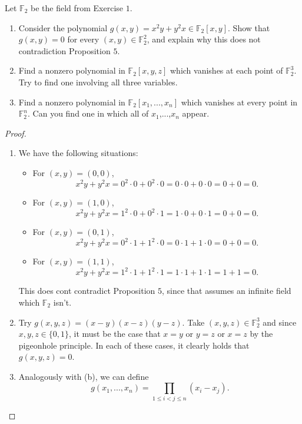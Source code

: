 \begin{exercise}{2}
Let $\mathbb{F}_2$ be the field from Exercise $1$.
\begin{enumerate}
    \item Consider the polynomial $g(x,y) = x^2 y + y^2 x\in \mathbb{F}_2[x,y]$. Show that $g(x,y) = 0$ for every $(x,y)\in \mathbb{F}_2^2$, and explain why this does not contradiction Proposition $5$.
    \item Find a nonzero polynomial in $\mathbb{F}_2[x,y,z]$ which vanishes at each point of $\mathbb{F}_2^3$. Try to find one involving all three variables.
    \item Find a nonzero polynomial in $\mathbb{F}_2[x_1,...,x_n]$ which vanishes at every point in $\mathbb{F}_2^n$. Can you find one in which all of $x_1$,...,$x_n$ appear.
\end{enumerate}
\end{exercise}
\begin{proof}
\begin{enumerate}
    \item We have the following situations:
    \begin{itemize}
        \item For $(x,y) = (0,0)$,
        $$x^2 y + y^2 x = 0^2\cdot 0 + 0^2 \cdot 0 = 0\cdot 0 + 0\cdot 0 = 0 + 0 = 0.$$
        \item For $(x,y) = (1,0)$,
        $$x^2 y + y^2 x = 1^2\cdot 0 + 0^2 \cdot 1 = 1\cdot 0 + 0\cdot 1 = 0 + 0 = 0.$$
        \item For $(x,y) = (0,1)$,
        $$x^2 y + y^2 x = 0^2\cdot 1 + 1^2 \cdot 0 = 0\cdot 1 + 1\cdot 0 = 0 + 0 = 0.$$
        \item For $(x,y) = (1,1)$,
        $$x^2 y + y^2 x = 1^2\cdot 1 + 1^2 \cdot 1 = 1\cdot 1 + 1\cdot 1 = 1 + 1 = 0.$$
    \end{itemize}
    This does cont contradict Proposition $5$, since that assumes an infinite field which $\mathbb{F}_2$ isn't.
    \item Try $g(x,y,z) = (x-y)(x-z)(y-z)$. Take $(x,y,z)\in \mathbb{F}_2^3$ and since $x,y,z\in \{0,1\}$, it must be the case that $x=y$ or $y=z$ or $x=z$ by the pigeonhole principle. In each of these cases, it clearly holds that $g(x,y,z) = 0$.
    \item Analogously with (b), we can define
    $$g(x_1,...,x_n) = \prod_{1\leq i<j\leq n} (x_i - x_j).$$
\end{enumerate}    
\end{proof}

